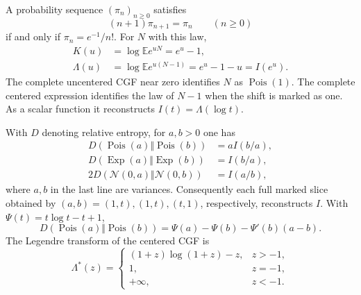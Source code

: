 \begin{theorem}
\label{final:P2}
A probability sequence $(\pi_n)_{n\geq0}$ satisfies
\[
 (n+1)\pi_{n+1}=\pi_n\qquad(n\geq0)
\]
if and only if $\pi_n=e^{-1}/n!$.  For $N$ with this law,
\begin{align}
 K(u)&=\log\mathbb E e^{uN}=e^u-1,\label{final:eq-poisson-cgf}\\
 \Lambda(u)&=\log\mathbb E e^{u(N-1)}=e^u-1-u=I(e^u).
       \label{final:eq-poisson-centered}
\end{align}
The complete uncentered CGF near zero identifies $N$ as
$\operatorname{Pois}(1)$.  The complete centered expression identifies
the law of $N-1$ when the shift is marked as one.  As a scalar
function it reconstructs $I(t)=\Lambda(\log t)$.

With $D$ denoting relative entropy, for $a,b>0$ one has
\begin{align}
 D(\operatorname{Pois}(a)\Vert\operatorname{Pois}(b))
     &=a I(b/a),\label{final:eq-poisson-kl}\\
 D(\operatorname{Exp}(a)\Vert\operatorname{Exp}(b))
     &=I(b/a),\label{final:eq-exp-kl}\\
 2D(\mathcal N(0,a)\Vert\mathcal N(0,b))
     &=I(a/b),\label{final:eq-gaussian-kl}
\end{align}
where $a,b$ in the last line are variances.  Consequently each full
marked slice obtained by $(a,b)=(1,t),(1,t),(t,1)$, respectively,
reconstructs $I$.  With $\Psi(t)=t\log t-t+1$,
\[
 D(\operatorname{Pois}(a)\Vert\operatorname{Pois}(b))
 =\Psi(a)-\Psi(b)-\Psi'(b)(a-b).
\]
The Legendre transform of the centered CGF is
\[
 \Lambda^*(z)=
 \begin{cases}
 (1+z)\log(1+z)-z,&z>-1,\\
 1,&z=-1,\\
 +\infty,&z<-1.
 \end{cases}
\]
\end{theorem}
